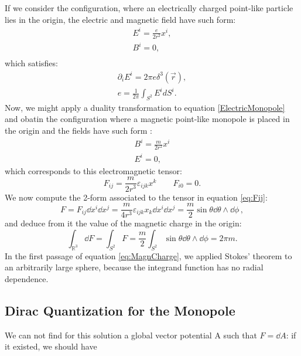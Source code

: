 \documentclass[main.tex]{subfiles}
\begin{document}
%
If we consider the configuration, where an electrically charged point-like particle lies in the origin, the electric and magnetic field have such form:
\begin{gather}\label{ElectricMonopole}
E^i=\frac{e}{2r^2}x^i,\\
B^i =0,\\
\end{gather}
%
which satisfies:
%
\begin{subequations}
\begin{align}
\partial_i E^i=2\pi e \delta^3(\vec r),\\
e=\frac{1}{2\pi}\int_{S^2} E^i d S^i.
\end{align}
\end{subequations}
%
Now, we might apply a duality transformation to equation \eqref{ElectricMonopole} and obatin the configuration where a magnetic point-like monopole is placed in the origin and the fields have such form :
%
\begin{gather}
\label{MagneticMonopole}
B^i=\frac{m}{2r^2}x^i\\
E^i=0,
\end{gather}
%
which corresponds to this electromagnetic tensor:
\begin{equation}\label{eq:Fij}
F_{ij}=\frac{m}{2r^3}\varepsilon_{ijk}x^k \qquad F_{i0}=0.
\end{equation}
%
We now compute the 2-form associated to the tensor in equation \ref{eq:Fij}:
%
\begin{equation}
F=F_{ij}\dd{x^i}\dd{x^j}=\frac{m}{4r^3}\varepsilon_{ijk}x_k\dd{x^i}\dd{x^j}=\frac{m}{2}\sin\theta \dd{\theta}\wedge \dd{\phi}\,,
\end{equation}
%
and deduce from it the value of the magnetic charge in the origin:
%
\begin{equation} \label{eq:MagnCharge}
\int_{\mathbb R^3} \dd{F} = \int_{S^2} F=\frac{m}{2}\int_{S^2}\sin\theta \dd{\theta}\wedge \dd{\phi}=2\pi m .
\end{equation}
%
In the first passage of equation \ref{eq:MagnCharge}, we applied Stokes' theorem to an arbitrarily large sphere, because the integrand function has no radial dependence.

\subsection{Dirac Quantization for the Monopole}
We can not find for this solution a global vector potential A such that $F=\dd{A}$: if it existed, we should have
\end{document}

